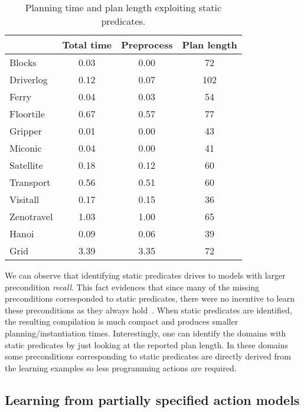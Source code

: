 \documentclass[letterpaper]{article} %
\begin{document}
\begin{table}
\begin{footnotesize}
	\begin{center}
		\begin{tabular}{l|c|c|c|}			
			 & Total time & Preprocess & Plan length  \\
			\hline
			Blocks & 0.03 & 0.00 & 72 \\
			Driverlog & 0.12 & 0.07 & 102 \\
			Ferry & 0.04 & 0.03 & 54 \\
			Floortile & 0.67 & 0.57 & 77 \\
			Gripper & 0.01 & 0.00 & 43 \\
			Miconic & 0.04 & 0.00 & 41 \\
			Satellite & 0.18 & 0.12 & 60 \\
			Transport & 0.56 & 0.51 & 60 \\
			Visitall & 0.17 & 0.15 & 36 \\
			Zenotravel & 1.03 & 1.00 & 65 \\
			Hanoi & 0.09 & 0.06 & 39 \\
			Grid & 3.39 & 3.35 & 72 \\
		\end{tabular}
	\end{center}
        \end{footnotesize}
	\caption{\small Planning time and plan length exploiting static predicates.}
	\label{tab:time_plans_static}	
\end{table}

We can observe that identifying static predicates drives to models with larger precondition {\em recall}. This fact evidences that since many of the missing preconditions corresponded to static predicates, there were no incentive to learn these preconditions as they always hold~\cite{gregory2015domain}. When static predicates are identified, the resulting compilation is much compact and produces smaller planning/instantiation times. Interestingly, one can identify the domains with static predicates by just looking at the reported plan length. In these domains some preconditions corresponding to static predicates are directly derived from the learning examples so less programming actions are required.


\subsection{Learning from partially specified action models}
\end{document}
